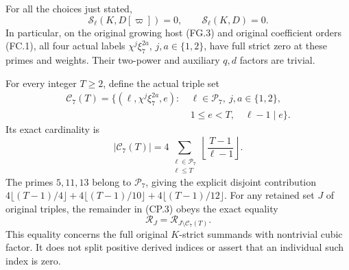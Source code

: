 \begin{theorem}
\label{AC-G209}
For all the choices just stated,
\[
             \mathcal S_\ell(K,D[\varpi])=0,
             \qquad\mathcal S_\ell(K,D)=0.
 \tag{MC7.4}
\]
In particular, on the original growing host (FG.3) and original
coefficient orders (FC.1), all four actual labels
$\chi^j\xi_7^{2a}$, $j,a\in\{1,2\}$, have full strict zero
at these primes and weights.  Their two-power and auxiliary
$q,d$ factors are trivial.

For every integer $T\geq2$, define the actual triple set
\[
 \begin{split}
 \mathcal C_7(T)=\{(\ell,\chi^j\xi_7^{2a},e):\ &\ell\in\mathscr P_7,
   \ j,a\in\{1,2\},\\
 &1\leq e<T,\quad\ell-1\mid e\}.
 \end{split}
 \tag{MC7.5}
\]
Its exact cardinality is
\[
 |\mathcal C_7(T)|=
 4\sum_{\substack{\ell\in\mathscr P_7\\\ell\leq T}}
                 \left\lfloor\frac{T-1}{\ell-1}\right\rfloor.
 \tag{MC7.6}
\]
The primes $5,11,13$ belong to $\mathscr P_7$, giving the
explicit disjoint contribution
$4\lfloor(T-1)/4\rfloor+4\lfloor(T-1)/10\rfloor
+4\lfloor(T-1)/12\rfloor$.
For any retained set $J$ of original triples, the remainder
in (CP.3) obeys the exact equality
\[
                   \mathcal R_J=\mathcal R_{J\setminus\mathcal C_7(T)}.
 \tag{MC7.7}
\]
This equality concerns the full original $K$-strict summands
with nontrivial cubic factor.  It does not split positive
derived indices or assert that an individual such index is zero.
\end{theorem}

